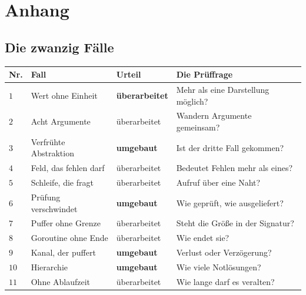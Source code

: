 \appendix
\part{Anhang}

\newcommand{\lit}[3]{\vspace{5pt}\noindent\textbf{[#1]} #2\par\nopagebreak\vspace{1pt}{\small\itshape\color{grau} #3}\par\vspace{2pt}}

\chapter{Die zwanzig Fälle}

\begin{merksatz}
\begin{center}
{\small
\renewcommand{\arraystretch}{1.38}
\begin{tabular}{@{}P{0.7cm}P{3.4cm}P{2.1cm}P{2.4cm}@{}}
\toprule
\textbf{Nr.} & \textbf{Fall} & \textbf{Urteil} & \textbf{Die Prüffrage}\\
\midrule
$1$ & Wert ohne Einheit & \textcolor{tief}{\textbf{überarbeitet}} & Mehr als eine Darstellung möglich?\\
$2$ & Acht Argumente & \textcolor{tief}{überarbeitet} & Wandern Argumente gemeinsam?\\
$3$ & Verfrühte Abstraktion & \textcolor{akzent}{\textbf{umgebaut}} & Ist der dritte Fall gekommen?\\
$4$ & Feld, das fehlen darf & \textcolor{tief}{überarbeitet} & Bedeutet Fehlen mehr als eines?\\
$5$ & Schleife, die fragt & \textcolor{tief}{überarbeitet} & Aufruf über eine Naht?\\
$6$ & Prüfung verschwindet & \textcolor{akzent}{\textbf{umgebaut}} & Wie geprüft, wie ausgeliefert?\\
$7$ & Puffer ohne Grenze & \textcolor{tief}{überarbeitet} & Steht die Größe in der Signatur?\\
$8$ & Goroutine ohne Ende & \textcolor{tief}{überarbeitet} & Wie endet sie?\\
$9$ & Kanal, der puffert & \textcolor{akzent}{\textbf{umgebaut}} & Verlust oder Verzögerung?\\
$10$ & Hierarchie & \textcolor{akzent}{\textbf{umgebaut}} & Wie viele Notlösungen?\\
$11$ & Ohne Ablaufzeit & \textcolor{tief}{überarbeitet} & Wie lange darf es veralten?\\

\end{tabular}}
\end{center}
\end{merksatz}
